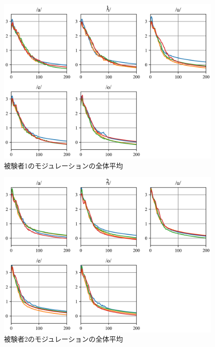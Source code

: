 \documentclass[10ptj,a4j,dvipdfmx,uplatex, oneside, openany]{jsbook}%
\begin{document}
\begin{figure}[htbp]
    \begin{center}
      \includegraphics[clip,width=12.0cm]{long_spectrogram_1.png}
      \caption{被験者1のモジュレーションの全体平均}
      \label{long_spectrogram_1}
    \end{center}
\end{figure}

\begin{figure}[htbp]
    \begin{center}
      \includegraphics[clip,width=12.0cm]{long_spectrogram_2.png}
      \caption{被験者2のモジュレーションの全体平均}
      \label{long_spectrogram_2}
    \end{center}
\end{figure}
\end{document}
